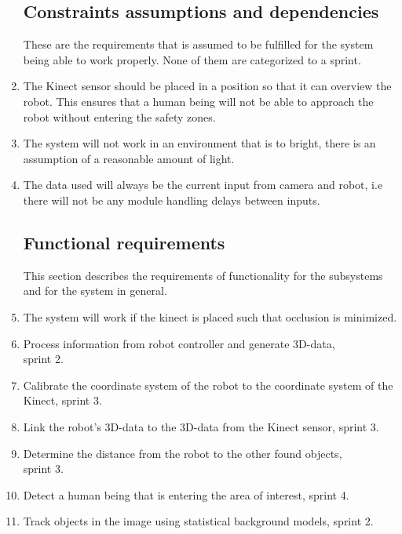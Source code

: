 \documentclass[10pt,a4paper]{article}
\begin{document}
\begin{enumerate}
\subsection{Constraints assumptions and dependencies}
These are the requirements that is assumed to be fulfilled for the system being able to work properly. None of them are categorized to a sprint.

\item The Kinect sensor should be placed in a position so that it can overview the robot. This ensures that a human being will not be able to approach the robot without entering the safety zones.

\item The system will not work in an environment that is to bright, there is an assumption of a reasonable amount of light.

\item The data used will always be the current input from camera and robot, i.e there will not be any module handling delays between inputs.

\subsection{Functional requirements}
This section describes the requirements of functionality for the subsystems and for the system in general.
\item The system will work if the kinect is placed such that occlusion is minimized. 
\item Process information from robot controller and generate 3D-data, \\sprint 2.
\item Calibrate the coordinate system of the robot to the coordinate system of the Kinect, sprint 3. 

\item Link the robot's 3D-data to the 3D-data from the Kinect sensor, sprint 3.

\item Determine the distance from the robot to the other found objects, \\sprint 3.


\item Detect a human being that is entering the area of interest, sprint 4.

\item Track objects in the image using statistical background models, sprint 2.

\end{enumerate}
\end{document}
